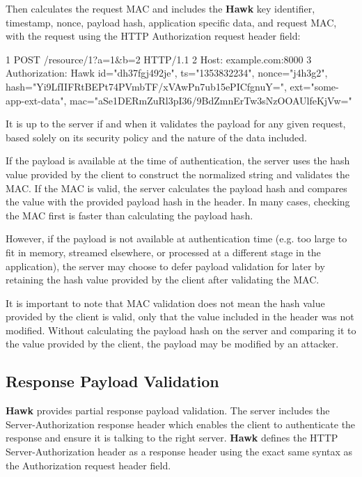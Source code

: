 Then calculates the request M\+A\+C and includes the {\bfseries Hawk} key identifier, timestamp, nonce, payload hash, application specific data, and request M\+A\+C, with the request using the H\+T\+T\+P {\ttfamily Authorization} request header field\+:


\begin{DoxyCode}
1 POST /resource/1?a=1&b=2 HTTP/1.1
2 Host: example.com:8000
3 Authorization: Hawk id="dh37fgj492je", ts="1353832234", nonce="j4h3g2",
       hash="Yi9LfIIFRtBEPt74PVmbTF/xVAwPn7ub15ePICfgnuY=", ext="some-app-ext-data", mac="aSe1DERmZuRl3pI36/9BdZmnErTw3sNzOOAUlfeKjVw="
\end{DoxyCode}


It is up to the server if and when it validates the payload for any given request, based solely on it\textquotesingle{}s security policy and the nature of the data included.

If the payload is available at the time of authentication, the server uses the hash value provided by the client to construct the normalized string and validates the M\+A\+C. If the M\+A\+C is valid, the server calculates the payload hash and compares the value with the provided payload hash in the header. In many cases, checking the M\+A\+C first is faster than calculating the payload hash.

However, if the payload is not available at authentication time (e.\+g. too large to fit in memory, streamed elsewhere, or processed at a different stage in the application), the server may choose to defer payload validation for later by retaining the hash value provided by the client after validating the M\+A\+C.

It is important to note that M\+A\+C validation does not mean the hash value provided by the client is valid, only that the value included in the header was not modified. Without calculating the payload hash on the server and comparing it to the value provided by the client, the payload may be modified by an attacker.

\subsection*{Response Payload Validation}

{\bfseries Hawk} provides partial response payload validation. The server includes the {\ttfamily Server-\/\+Authorization} response header which enables the client to authenticate the response and ensure it is talking to the right server. {\bfseries Hawk} defines the H\+T\+T\+P {\ttfamily Server-\/\+Authorization} header as a response header using the exact same syntax as the {\ttfamily Authorization} request header field.

